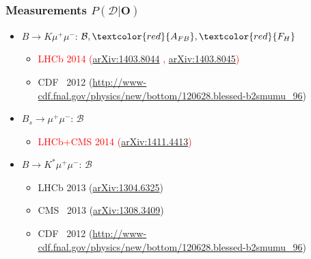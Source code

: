 \documentclass[english]{beamer}
\newcommand{\slide}[2][t]{\begin{frame}[#1] \frametitle{\insertsection} #2 \end{frame}}
\newcommand{\red}[1]{\textcolor{red}{#1}}
\begin{document}
\slide[c]{

    \frametitle{Measurements $ P\left(\mathcal{D} | \boldsymbol{O} \right) $}

    \begin{itemize}
        \item $B\rightarrow K\mu^+\mu^-$: $\mathcal{B} , \red{A_{FB}} , \red{F_H}$
        \begin{itemize}
            \item \red{LHCb 2014 {\tiny (\href{http://arXiv.org/abs/1403.8044}{arXiv:1403.8044} , \href{http://arXiv.org/abs/1403.8045}{arXiv:1403.8045})}}
            \item CDF~ 2012 {\tiny (\url{http://www-cdf.fnal.gov/physics/new/bottom/120628.blessed-b2smumu_96})}
        \end{itemize}

        \item $B_s\rightarrow\mu^+\mu^-$: $\mathcal{B}$

        \begin{itemize}
            \item \red{LHCb+CMS 2014 {\tiny({\href{http://arXiv.org/abs/1411.4413}{arXiv:1411.4413}})}}
        \end{itemize}

        \item $B\rightarrow K^\ast\mu^+\mu^-$: $\mathcal{B}$

        \begin{itemize}
            \item LHCb 2013 {\tiny({\href{http://arXiv.org/abs/1304.6325}{arXiv:1304.6325}})}
            \item CMS~ 2013 {\tiny({\href{http://arXiv.org/abs/1308.3409}{arXiv:1308.3409}})}
            \item CDF~ 2012 {\tiny (\url{http://www-cdf.fnal.gov/physics/new/bottom/120628.blessed-b2smumu_96})}
        \end{itemize}
    \end{itemize}

}
\end{document}
